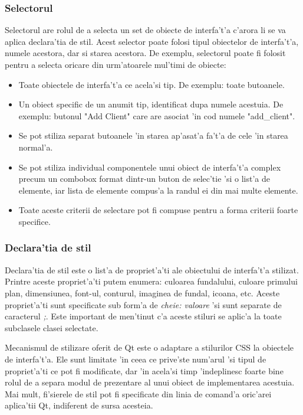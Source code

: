 \subsubsection{Selectorul}

Selectorul are rolul de a selecta un set de obiecte de interfa't'a c'arora li se va aplica declara'tia de stil. Acest selector poate folosi tipul obiectelor de interfa't'a, numele acestora, dar si starea acestora. De exemplu, selectorul poate fi folosit pentru a selecta oricare din urm'atoarele mul'timi de obiecte: 
\begin{itemize}
\item Toate obiectele de interfa't'a ce acela'si tip. De exemplu: toate butoanele.
\item Un obiect specific de un anumit tip, identificat dupa numele acestuia. De exemplu: butonul "Add Client" care are asociat 'in cod numele "add\_client".
\item Se pot stiliza separat butoanele 'in starea ap'asat'a fa't'a de cele 'in starea normal'a.
\item Se pot stiliza individual componentele unui obiect de interfa't'a complex precum un combobox format dintr-un buton de selec'tie 'si o list'a de elemente, iar lista de elemente compus'a la randul ei din mai multe elemente.
\item Toate aceste criterii de selectare pot fi compuse pentru a forma criterii foarte specifice.
\end{itemize}

\subsubsection{Declara'tia de stil}

Declara'tia de stil este o list'a de propriet'a'ti ale obiectului de interfa't'a stilizat. Printre aceste propriet'a'ti putem enumera: culoarea fundalului, culoare primului plan, dimensiunea, font-ul, conturul, imaginea de fundal, icoana, etc. Aceste propriet'a'ti sunt specificate sub form'a de \emph{cheie: valoare} 'si sunt separate de caracterul \emph{;}. Este important de men'tinut c'a aceste stiluri se aplic'a la toate subclasele clasei selectate.

\medskip

Mecanismul de stilizare oferit de Qt este o adaptare a stilurilor CSS la obiectele de interfa't'a. Ele sunt limitate 'in ceea ce prive'ste num'arul 'si tipul de propriet'a'ti ce pot fi modificate, dar 'in acela'si timp 'indeplinesc foarte bine rolul de a separa modul de prezentare al unui obiect de implementarea acestuia. Mai mult, fi'sierele de stil pot fi specificate din linia de comand'a oric'arei aplica'tii Qt, indiferent de sursa acesteia.

